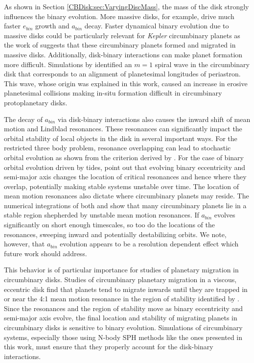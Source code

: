 As shown in Section \ref{CBDisk:sec:VaryingDiscMass}, the mass of the disk strongly influences the binary evolution.  More massive disks, for example, drive much faster 
$e_{bin}$ growth and $a_{bin}$ decay.  Faster dynamical binary evolution due to massive disks could be particularly relevant for {\em Kepler} circumbinary 
planets as the work of \citet{Dunhill2013} suggests that these circumbinary planets formed and migrated in massive disks.  Additionally, disk-binary interactions 
can make planet formation more difficult.  Simulations by \citet{Lines2016} identified an $m = 1$ spiral wave in the circumbinary disk that corresponds to an 
alignment of planetesimal longitudes of periastron.  This wave, whose origin was explained in this work, caused an increase in erosive planetesimal 
collisions making in-situ formation difficult in circumbinary protoplanetary disks.

The decay of $a_{bin}$ via disk-binary interactions also causes the inward shift of mean motion and Lindblad resonances.  These resonances can significantly 
impact the orbital stability of local objects in the disk in several important ways.  For the restricted three body problem, resonance overlapping can lead to 
stochastic orbital evolution as shown from the criterion derived by \citet{Wisdom1980}.  For the case of binary orbital evolution driven by tides, \citet{Bromley2015} 
point out that evolving binary eccentricity and semi-major axis changes the location of critical resonances and hence where they overlap, potentially making 
stable systems unstable over time.  The location of mean motion resonances also dictate where circumbinary planets may reside.  The numerical integrations 
of both \citet{Popova2013} and \citet{Chavez2015} show that many circumbinary planets lie in a stable region shepherded by unstable mean motion resonances.  If 
$a_{bin}$ evolves significantly on short enough timescales, so too do the locations of the resonances, sweeping inward and potentially destabilizing orbits.  
We note, however, that $a_{bin}$ evolution appears to be a resolution dependent effect which future work should address.

This behavior is of particular importance for studies of planetary migration in circumbinary disks.  Studies of circumbinary planetary migration in a viscous, 
eccentric disk find that planets tend to migrate inwards until they are trapped in or near the 4:1 mean motion resonance in the region of stability identified by 
\citet{Holman1999} \citep{Nelson2003,Kley2014}.  Since the resonances and the region of stability move as binary eccentricity and semi-major axis evolve, the 
final location and stability of migrating planets in circumbinary disks is sensitive to binary evolution.  Simulations of circumbinary systems, especially those 
using N-body SPH methods like the ones presented in this work, must ensure that they properly account for the disk-binary interactions.

